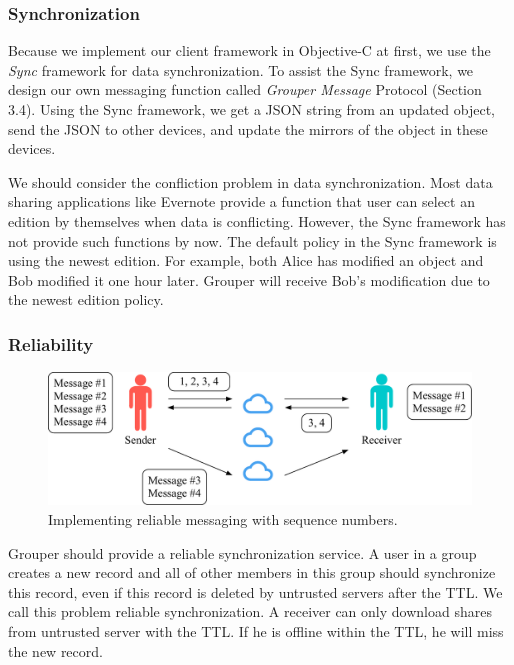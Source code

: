 \documentclass[twocolumn,10pt]{article}
\begin{document}
\subsubsection{Synchronization}

Because we implement our client framework in Objective-C at first, we use the \emph{Sync} framework\cite{sync} for data synchronization.
To assist the Sync framework, we design our own messaging function called \emph{Grouper Message} Protocol (Section 3.4).
Using the Sync framework, we get a JSON string from an updated object, send the JSON to other devices, and update the mirrors of the object in these devices. 

We should consider the confliction problem in data synchronization. Most data sharing applications like Evernote provide a function that user can select an edition by themselves when data is conflicting. However, the Sync framework has not provide such functions by now. The default policy in the Sync framework is using the newest edition. For example, both Alice has modified an object and Bob modified it one hour later. Grouper will receive Bob's modification due to the newest edition policy. 

\subsubsection{Reliability}

\begin{figure}[t]
	\centering
	\includegraphics[scale=0.38]{reliable_sync}
	\caption{Implementing reliable messaging with sequence numbers.}
\end{figure}

Grouper should provide a reliable synchronization service. 
A user in a group creates a new record and all of other members in this group should synchronize this record, even if this record is deleted by untrusted servers after the TTL. 
We call this problem reliable synchronization. 
A receiver can only download shares from untrusted server with the TTL. 
If he is offline within the TTL, he will miss the new record.
\end{document}
